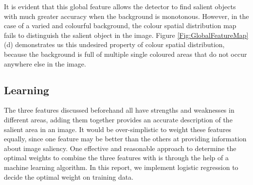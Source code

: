 \documentclass[10pt,twocolumn,letterpaper]{article}
\begin{document}
It is evident that this global feature allows the detector to find salient objects with much greater accuracy when the background is monotonous. However, in the case of a varied and colourful background, the colour spatial distribution map fails to distinguish the salient object in the image. Figure \ref{Fig:GlobalFeatureMap} (d) demonstrates us this undesired property of colour spatial distribution, because the background is full of multiple single coloured areas that do not occur anywhere else in the image.









\newcommand{\bl}{\boldsymbol{\lambda}}
\newcommand{\bt}{\boldsymbol{t}}
\newcommand{\btx}{\boldsymbol{t}_x}
\newcommand{\bphix}{\boldsymbol{\phi}_x}

\subsection{Learning}
The three features discussed beforehand all have strengths and weaknesses in different areas, adding them together provides an accurate description of the salient area in an image.  It would be over-simplistic to weight these features equally, since one feature may be better than the others at providing information about image saliency. One effective and reasonable approach to determine the optimal weights to combine the three features with is through the help of a machine learning algorithm.  In this report, we implement logistic regression to decide the optimal weight on training data.
\end{document}
